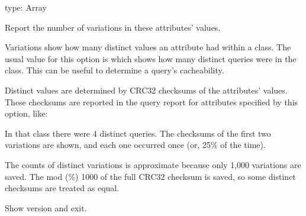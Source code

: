 \documentclass[letterpaper,10pt,english]{sphinxmanual}
\begin{document}
\begin{fulllineitems}
\label{\detokenize{mariadb-query-digest:cmdoption-mariadb-query-digest-variations}}
\sphinxAtStartPar
type: Array

\sphinxAtStartPar
Report the number of variations in these attributes’ values.

\sphinxAtStartPar
Variations show how many distinct values an attribute had within a class.
The usual value for this option is  which shows how many distinct queries
were in the class.  This can be useful to determine a query’s cacheability.

\sphinxAtStartPar
Distinct values are determined by CRC32 checksums of the attributes’ values.
These checksums are reported in the query report for attributes specified by
this option, like:

\begin{sphinxVerbatim}[commandchars=\\\{\}]
\end{sphinxVerbatim}

\sphinxAtStartPar
In that class there were 4 distinct queries.  The checksums of the first two
variations are shown, and each one occurred once (or, 25\% of the time).

\sphinxAtStartPar
The counts of distinct variations is approximate because only 1,000 variations
are saved.  The mod (\%) 1000 of the full CRC32 checksum is saved, so some
distinct checksums are treated as equal.

\end{fulllineitems}


\begin{fulllineitems}
\label{\detokenize{mariadb-query-digest:cmdoption-mariadb-query-digest-version}}
\sphinxAtStartPar
Show version and exit.

\end{fulllineitems}
\end{document}
